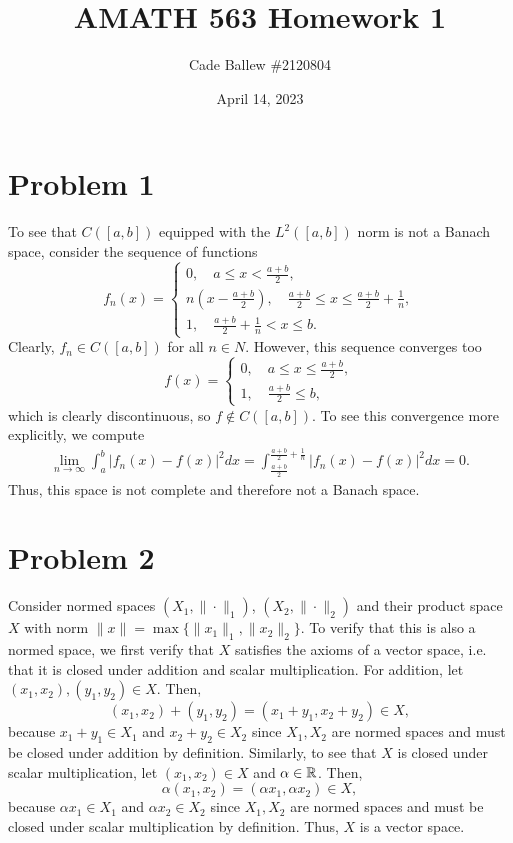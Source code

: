 \documentclass{article}
\title{AMATH 563 Homework 1}
\author{Cade Ballew \#2120804}
\date{April 14, 2023}
\begin{document}
	
\maketitle
	
\section{Problem 1}
To see that $C([a,b])$ equipped with the $L^2([a,b])$ norm is not a Banach space, consider the sequence of functions
\[
f_n(x)=\begin{cases}
	0, \quad a\leq x<\frac{a+b}{2},\\
	n\left(x-\frac{a+b}{2}\right),\quad \frac{a+b}{2}\leq x\leq \frac{a+b}{2}+\frac{1}{n},\\
	1,\quad \frac{a+b}{2}+\frac{1}{n}<x\leq b.
\end{cases}
\]
Clearly, $f_n\in C([a,b])$ for all $n\in N$. However, this sequence converges too
\[
f(x)=\begin{cases}
	0,\quad a\leq x\leq\frac{a+b}{2},\\
	1,\quad \frac{a+b}{2}\leq b,
\end{cases}
\]
which is clearly discontinuous, so $f\notin C([a,b])$. To see this convergence more explicitly, we compute
\begin{align*}
\lim_{n\to\infty}\int_{a}^{b}|f_n(x)-f(x)|^2dx=\int_{\frac{a+b}{2}}^{\frac{a+b}{2}+\frac{1}{n}}|f_n(x)-f(x)|^2dx=0.
\end{align*}
Thus, this space is not complete and therefore not a Banach space.

\section{Problem 2}
Consider normed spaces $(X_1,\|\cdot\|_1)$, $(X_2,\|\cdot\|_2)$ and their product space $X$ with norm $\|x\|=\max\{\|x_1\|_1,\|x_2\|_2\}$. To verify that this is also a normed space, we first verify that $X$ satisfies the axioms of a vector space, i.e. that it is closed under addition and scalar multiplication. For addition, let $(x_1,x_2),(y_1,y_2)\in X$. Then,
\[
(x_1,x_2)+(y_1,y_2)=(x_1+y_1,x_2+y_2)\in X,
\]
because $x_1+y_1\in X_1$ and $x_2+y_2\in X_2$ since $X_1,X_2$ are normed spaces and must be closed under addition by definition. Similarly, to see that $X$ is closed under scalar multiplication, let $(x_1,x_2)\in X$ and $\alpha\in\mathbb{R}$. Then, 
\[
\alpha(x_1,x_2)=(\alpha x_1,\alpha x_2)\in X,
\]
because $\alpha x_1\in X_1$ and $\alpha x_2\in X_2$ since $X_1,X_2$ are normed spaces and must be closed under scalar multiplication by definition. Thus, $X$ is a vector space. 
\end{document}
